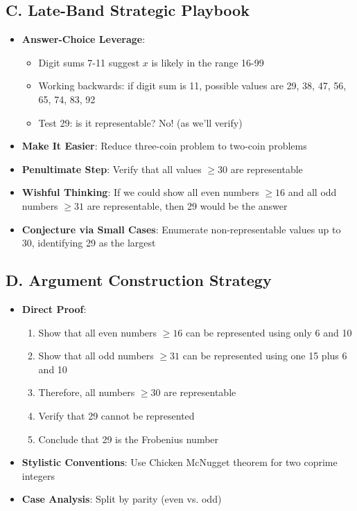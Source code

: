 \documentclass[12pt]{article}
\begin{document}
\begin{strategicbox}
\subsection*{C. Late-Band Strategic Playbook}
\begin{itemize}[leftmargin=*]
    \item \textbf{Answer-Choice Leverage}: 
    \begin{itemize}
        \item Digit sums 7-11 suggest $x$ is likely in the range 16-99
        \item Working backwards: if digit sum is 11, possible values are 29, 38, 47, 56, 65, 74, 83, 92
        \item Test 29: is it representable? No! (as we'll verify)
    \end{itemize}
    \item \textbf{Make It Easier}: Reduce three-coin problem to two-coin problems
    \item \textbf{Penultimate Step}: Verify that all values $\geq 30$ are representable
    \item \textbf{Wishful Thinking}: If we could show all even numbers $\geq 16$ and all odd numbers $\geq 31$ are representable, then 29 would be the answer
    \item \textbf{Conjecture via Small Cases}: Enumerate non-representable values up to 30, identifying 29 as the largest
\end{itemize}

\subsection*{D. Argument Construction Strategy}
\begin{itemize}[leftmargin=*]
    \item \textbf{Direct Proof}: 
    \begin{enumerate}
        \item Show that all even numbers $\geq 16$ can be represented using only 6 and 10
        \item Show that all odd numbers $\geq 31$ can be represented using one 15 plus 6 and 10
        \item Therefore, all numbers $\geq 30$ are representable
        \item Verify that 29 cannot be represented
        \item Conclude that 29 is the Frobenius number
    \end{enumerate}
    \item \textbf{Stylistic Conventions}: Use Chicken McNugget theorem for two coprime integers
    \item \textbf{Case Analysis}: Split by parity (even vs. odd)
\end{itemize}


\end{strategicbox}
\end{document}
